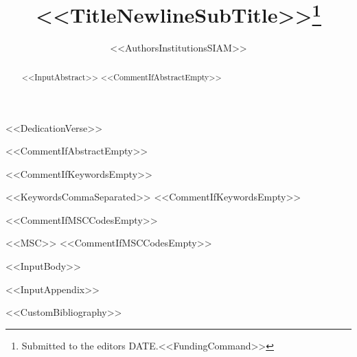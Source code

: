 \documentclass[%
review,
onefignum,
onetabnum,
<<DocumentClassOptions>>]{siamart250106}
\title{<<TitleNewlineSubTitle>>\thanks{Submitted to the editors DATE.<<FundingCommand>>}}
\author{%
<<AuthorsInstitutionsSIAM>>
}
\begin{document}
\maketitle

<<DedicationVerse>>

<<CommentIfAbstractEmpty>>\begin{abstract}
<<InputAbstract>>
<<CommentIfAbstractEmpty>>\end{abstract}

<<CommentIfKeywordsEmpty>>\begin{keywords}
<<KeywordsCommaSeparated>>
<<CommentIfKeywordsEmpty>>\end{keywords}

<<CommentIfMSCCodesEmpty>>\begin{MSCcodes}
<<MSC>>
<<CommentIfMSCCodesEmpty>>\end{MSCcodes}

<<InputBody>>

\appendix
<<InputAppendix>>


<<CustomBibliography>>
\end{document}

